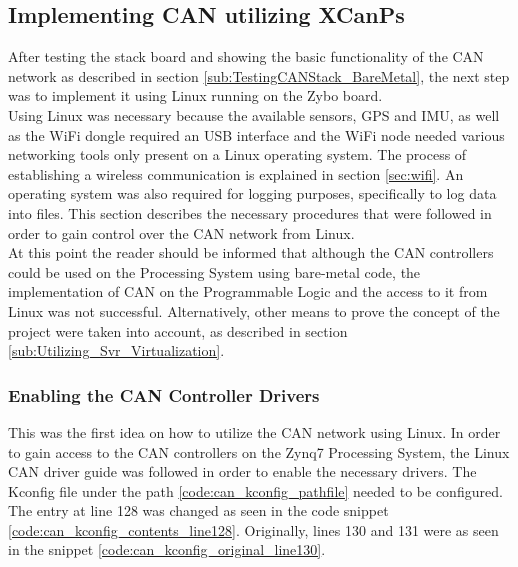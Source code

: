 \subsection{Implementing CAN utilizing XCanPs}\label{sec:methods_to_implement_can}


After testing the stack board and showing the basic functionality of the CAN network as described in section \ref{sub:TestingCANStack_BareMetal}, the next step was to implement it using Linux running on the Zybo board.\\
Using Linux was necessary because the available sensors, GPS and IMU, as well as the WiFi dongle required an USB interface and the WiFi node needed various networking tools only present on a Linux operating system.
The process of establishing a wireless communication is explained in section \ref{sec:wifi}.
An operating system was also required for logging purposes, specifically to log data into files.
This section describes the necessary procedures that were followed in order to gain control over the CAN network from Linux.
~\\
At this point the reader should be informed that although the CAN controllers could be used on the Processing System using bare-metal code, the implementation of CAN on the Programmable Logic and the access to it from Linux was not successful.
Alternatively, other means to prove the concept of the project were taken into account, as described in section \ref{sub:Utilizing_Svr_Virtualization}.

\subsubsection*{Enabling the CAN Controller Drivers}

This was the first idea on how to utilize the CAN network using Linux.
In order to gain access to the CAN controllers on the Zynq7 Processing System, the Linux CAN driver guide \cite{Xilinx_wiki_Linux_CAN_driver} was followed in order to enable the necessary drivers.
The Kconfig file under the path \ref{code:can_kconfig_pathfile} needed to be configured.
The entry at line 128 was changed as seen in the code snippet \ref{code:can_kconfig_contents_line128}.
Originally, lines 130 and 131 were as seen in the snippet \ref{code:can_kconfig_original_line130}.

